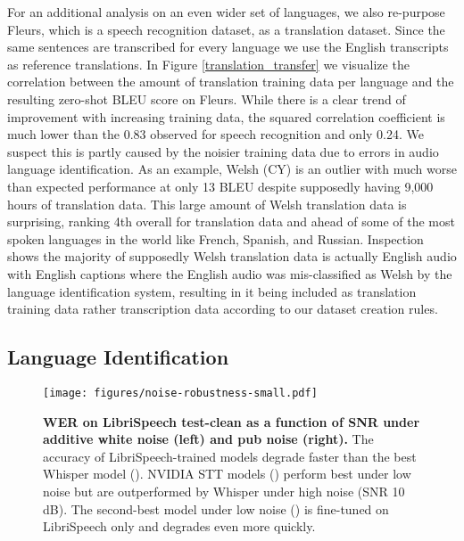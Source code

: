 \documentclass[nohyperref]{article}
\theoremstyle{plain}
\theoremstyle{definition}
\theoremstyle{remark}
\begin{document}
For an additional analysis on an even wider set of languages, we also re-purpose Fleurs, which is a speech recognition dataset, as a translation dataset. Since the same sentences are transcribed for every language we use the English transcripts as reference translations. In Figure \ref{translation_transfer} we visualize the correlation between the amount of translation training data per language and the resulting zero-shot BLEU score on Fleurs. While there is a clear trend of improvement with increasing training data, the squared correlation coefficient is much lower than the 0.83 observed for speech recognition and only 0.24. We suspect this is partly caused by the noisier training data due to errors in audio language identification. As an example, Welsh ({\footnotesize\textsf{CY}}) is an outlier with much worse than expected performance at only 13 BLEU despite supposedly having 9,000 hours of translation data. This large amount of Welsh translation data is surprising, ranking 4th overall for translation data and ahead of some of the most spoken languages in the world like French, Spanish, and Russian. Inspection shows the majority of supposedly Welsh translation data is actually English audio with English captions where the English audio was mis-classified as Welsh by the language identification system, resulting in it being included as translation training data rather transcription data according to our dataset creation rules.

\subsection{Language Identification}\label{subsec:language-id}

\begin{figure}[t]
\begin{center}
\centerline{\texttt{[image: figures/noise-robustness-small.pdf]}}
\caption{\textbf{WER on LibriSpeech test-clean as a function of SNR under additive white noise (left) and pub noise (right).} The accuracy of LibriSpeech-trained models degrade faster than the best Whisper model ({\color{red}}). NVIDIA STT models ({\color{C2}}) perform best under low noise but are outperformed by Whisper under high noise (SNR  10 dB). The second-best model under low noise ({\color{C0}}) is fine-tuned on LibriSpeech only and degrades even more quickly.}
\label{fig:noise-robustness}
\end{center}
\vspace{-1em}
\end{figure}
\end{document}
